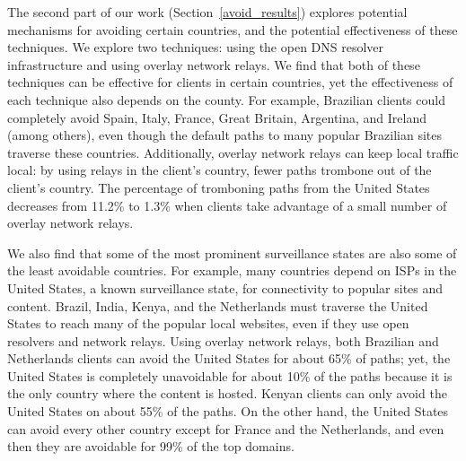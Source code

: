 The second part of our work (Section~\ref{avoid_results}) explores
potential mechanisms for avoiding certain countries, and the potential
effectiveness of these techniques.  We explore two techniques: using the
open DNS resolver infrastructure and using overlay network relays.  We
find that both of these techniques can be effective for clients in
certain countries, yet the effectiveness of each technique also depends
on the county.  For example, Brazilian clients could completely avoid
Spain, Italy, France, Great Britain, Argentina, and Ireland (among
others), even though the default paths to many popular Brazilian sites
traverse these countries. Additionally, overlay network relays can keep
local traffic local: by using relays in the client's country, fewer
paths trombone out of the client's country.  The percentage of
tromboning paths from the United States decreases from 11.2\% to 1.3\%
when clients take advantage of a small number of overlay network relays.

We also find that some of the most prominent surveillance states are
also some of the least avoidable countries.  For example, many countries
depend on ISPs in the United States, a known surveillance state, for
connectivity to popular sites and content. Brazil, India, Kenya, and
the Netherlands must traverse the United States to reach many of the
popular local websites, even if they use open resolvers and network
relays. Using overlay network relays, both Brazilian and Netherlands
clients can avoid the United States for about 65\% of paths; yet, the
United States is completely unavoidable for about 10\% of the paths
because it is the only country where the content is hosted.  Kenyan
clients can only avoid the United States on about 55\% of the paths.  On
the other hand, the United States can avoid every other country except
for France and the Netherlands, and even then they are avoidable for
99\% of the top domains.

